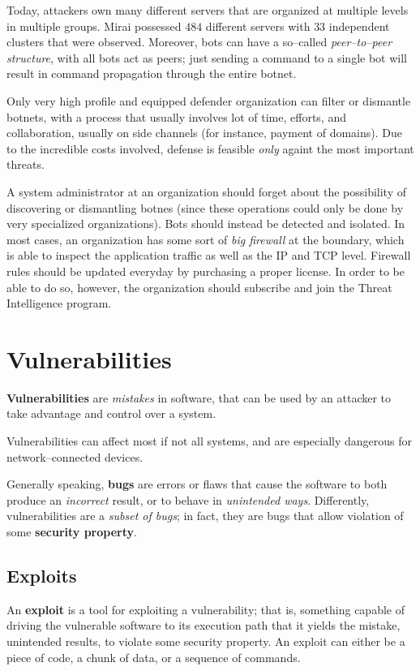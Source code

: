 \documentclass[10pt]{extreport}
\begin{document}
Today, attackers own many different servers that are organized at multiple
levels in multiple groups. Mirai possessed $484$ different servers with $33$
independent clusters that were observed. Moreover, bots can have a so--called
\emph{peer--to--peer structure}, with all bots act as peers; just sending a
command to a single bot will result in command propagation through the entire
botnet.

Only very high profile and equipped defender organization can filter or
dismantle botnets, with a process that usually involves lot of time, efforts,
and collaboration, usually on side channels (for instance, payment of domains).
Due to the incredible costs involved, defense is feasible \emph{only} againt
the most important threats.

A system administrator at an organization should forget about the possibility
of discovering or dismantling botnes (since these operations could only be done
by very specialized organizations). Bots should instead be detected and isolated.
In most cases, an organization has some sort of \emph{big firewall} at the
boundary, which is able to inspect the application traffic as well as the IP
and TCP level. Firewall rules should be updated everyday by purchasing a proper
license. In order to be able to do so, however, the organization should
subscribe and join the Threat Intelligence program.

\section{Vulnerabilities}

\textbf{Vulnerabilities} are \emph{mistakes} in software, that can be used by
an attacker to take advantage and control over a system.

Vulnerabilities can affect most if not all systems, and are especially
dangerous for network--connected devices.

Generally speaking, \textbf{bugs} are errors or flaws that cause the software
to both produce an \emph{incorrect} result, or to behave in \emph{unintended
ways}. Differently, vulnerabilities are a \emph{subset of bugs}; in fact, they
are bugs that allow violation of some \textbf{security property}.

\subsection{Exploits}

An \textbf{exploit} is a tool for exploiting a vulnerability; that is,
something capable of driving the vulnerable software to its execution path that
it yields the mistake, unintended results, to violate some security property.
An exploit can either be a piece of code, a chunk of data, or a sequence of
commands.
\end{document}
